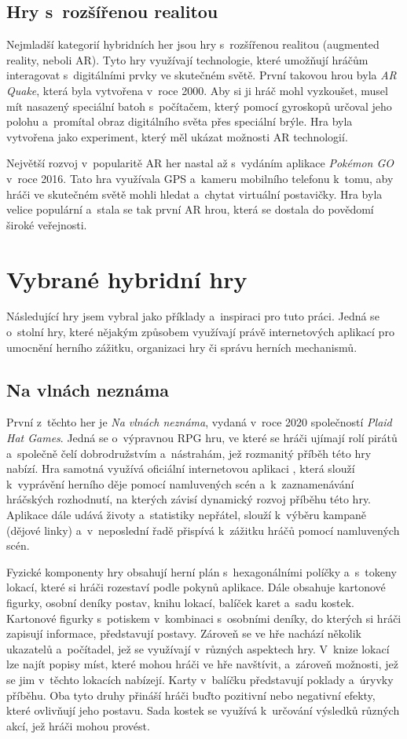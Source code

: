 \subsection{Hry s~rozšířenou realitou}
Nejmladší kategorií hybridních her jsou hry s~rozšířenou realitou (augmented reality, neboli AR). Tyto hry využívají technologie, které umožňují hráčům interagovat s~digitálními prvky ve skutečném světě. První takovou hrou byla \textit{AR Quake}, která byla vytvořena v~roce 2000. Aby si ji hráč mohl vyzkoušet, musel mít nasazený speciální batoh s~počítačem, který pomocí gyroskopů určoval jeho polohu a~promítal obraz digitálního světa přes speciální brýle. Hra byla vytvořena jako experiment, který měl ukázat možnosti AR technologií. \cite{ar_history}

Největší rozvoj v~popularitě AR her nastal až s~vydáním aplikace \textit{Pokémon GO} v~roce 2016. Tato hra využívala GPS a~kameru mobilního telefonu k~tomu, aby hráči ve skutečném světě mohli hledat a~chytat virtuální postavičky. Hra byla velice populární a~stala se tak první AR hrou, která se dostala do povědomí široké veřejnosti.

\section{Vybrané hybridní hry}
Následující hry jsem vybral jako příklady a~inspiraci pro tuto práci. Jedná se o~stolní hry, které nějakým způsobem využívají právě internetových aplikací pro umocnění herního zážitku, organizaci hry či správu herních mechanismů.

\subsection{Na vlnách neznáma}
První z~těchto her je \textit{Na vlnách neznáma}, vydaná v~roce 2020 společností \textit{Plaid Hat Games}. Jedná se o~výpravnou RPG hru, ve které se hráči ujímají rolí pirátů a~společně čelí dobrodružstvím a~nástrahám, jež rozmanitý příběh této hry nabízí. Hra samotná využívá oficiální internetovou aplikaci \cite{forgotten_waters_app}, která slouží k~vyprávění herního děje pomocí namluvených scén a~k~zaznamenávání hráčských rozhodnutí, na kterých závisí dynamický rozvoj příběhu této hry. Aplikace dále udává životy a~statistiky nepřátel, slouží k~výběru kampaně (dějové linky) a~v~neposlední řadě přispívá k~zážitku hráčů pomocí namluvených scén.

Fyzické komponenty hry obsahují herní plán s~hexagonálními políčky a~s~tokeny lokací, které si hráči rozestaví podle pokynů aplikace. Dále obsahuje kartonové figurky, osobní deníky postav, knihu lokací, balíček karet a~sadu kostek. Kartonové figurky s~potiskem v~kombinaci s~osobními deníky, do kterých si hráči zapisují informace, představují postavy. Zároveň se ve hře nachází několik ukazatelů a~počítadel, jež se využívají v~různých aspektech hry. V~knize lokací lze najít popisy míst, které mohou hráči ve hře navštívit, a~zároveň možnosti, jež se jim v~těchto lokacích nabízejí. Karty v~balíčku představují poklady a~úryvky příběhu. Oba tyto druhy přináší hráči buďto pozitivní nebo negativní efekty, které ovlivňují jeho postavu. Sada kostek se využívá k~určování výsledků různých akcí, jež hráči mohou provést.

